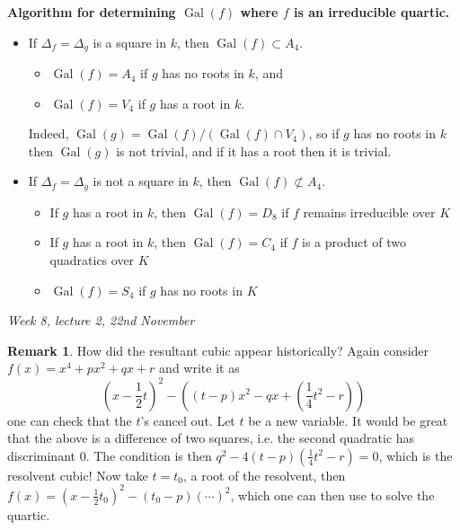 \documentclass{article}
\newcommand{\Gal}{\operatorname{Gal}}
\theoremstyle{definition}
\newtheorem{remark}[defn]{Remark}
\begin{document}
\textbf{Algorithm for determining $\Gal(f)$ where $f$ is an irreducible quartic.}
\begin{itemize}
\item If $\Delta_f=\Delta_g$ is a square in $k$, then $\Gal(f)\subset A_4$.
\begin{itemize}
\item $\Gal(f)=A_4$ if $g$ has no roots in $k$, and
\item $\Gal(f)=V_4$ if $g$ has a root in $k$.
\end{itemize}
Indeed, $\Gal(g)=\Gal(f)/\left(\Gal(f)\cap V_4\right)$, so if $g$ has no roots in $k$ then $\Gal(g)$ is not trivial, and if it has a root then it is trivial.
\item If $\Delta_f=\Delta_g$ is not a square in $k$, then $\Gal(f)\not\subset A_4$.
\begin{itemize}
\item If $g$ has a root in $k$, then $\Gal(f)=D_8$ if $f$ remains irreducible over $K$
\item If $g$ has a root in $k$, then $\Gal(f)=C_4$ if $f$ is a product of two quadratics over $K$
\item $\Gal(f)=S_4$ if $g$ has no roots in $K$
\end{itemize}
\end{itemize}

\begin{flushright}
\textit{Week 8, lecture 2, 22nd November}
\end{flushright}

\begin{remark}
How did the resultant cubic appear historically? Again consider $f(x)=x^4+px^2+qx+r$ and write it as
\[
\left(x-\frac12 t\right)^2-\left((t-p)x^2-qx+\left(\frac14 t^2-r\right)\right)
\]
one can check that the $t$'s cancel out. Let $t$ be a new variable. It would be great that the above is a difference of two squares, i.e. the second quadratic has discriminant 0. The condition is then $q^2-4(t-p)\left(\frac14 t^2-r\right)=0$, which is the resolvent cubic! Now take $t=t_0$, a root of the resolvent, then $f(x)=\left(x-\frac12 t_0\right)^2-(t_0-p)(\cdots)^2$, which one can then use to solve the quartic.
\end{remark}
\end{document}
